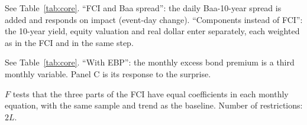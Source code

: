 \documentclass[11pt]{article}
\begin{document}
\begin{table}[H]\centering\small
\caption{Relaxing the key assumptions: credit spread added, and the FCI replaced by its three parts}\label{tab:cc}
{\setlength{\tabcolsep}{4pt}\resizebox{\ifdim\width>\linewidth\linewidth\else\width\fi}{!}{}}
\par\smallskip\begin{minipage}{0.95\textwidth}\footnotesize See Table~\ref{tab:core}. ``FCI and Baa spread'': the daily Baa-10-year spread is added and responds on impact (event-day change). ``Components instead of FCI'': the 10-year yield, equity valuation and real dollar enter separately, each weighted as in the FCI and in the same step.\end{minipage}
\end{table}
\begin{table}[H]\centering\small
\caption{Excess bond premium added to the monthly block}\label{tab:ebp}
{\setlength{\tabcolsep}{4pt}\resizebox{\ifdim\width>\linewidth\linewidth\else\width\fi}{!}{}}
\par\smallskip\begin{minipage}{0.95\textwidth}\footnotesize See Table~\ref{tab:core}. ``With EBP'': the monthly excess bond premium is a third monthly variable. Panel C is its response to the surprise.\end{minipage}
\end{table}
\begin{table}[H]\centering\small
\caption{Tests of the proportional-weights restriction: $p$-values}\label{tab:prop}

\par\smallskip\begin{minipage}{0.95\textwidth}\footnotesize $F$ tests that the three parts of the FCI have equal coefficients in each monthly equation, with the same sample and trend as the baseline. Number of restrictions: $2L$.\end{minipage}
\end{table}
\end{document}
